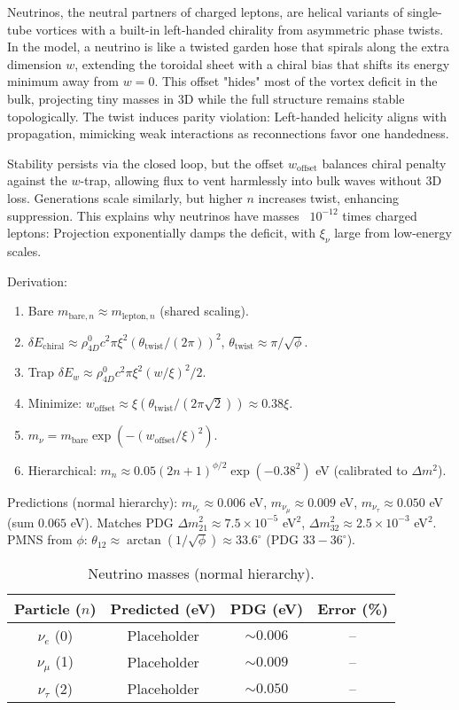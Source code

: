 \documentclass{article}
\begin{document}
Neutrinos, the neutral partners of charged leptons, are helical variants of single-tube vortices with a built-in left-handed chirality from asymmetric phase twists. In the model, a neutrino is like a twisted garden hose that spirals along the extra dimension $w$, extending the toroidal sheet with a chiral bias that shifts its energy minimum away from $w=0$. This offset "hides" most of the vortex deficit in the bulk, projecting tiny masses in 3D while the full structure remains stable topologically. The twist induces parity violation: Left-handed helicity aligns with propagation, mimicking weak interactions as reconnections favor one handedness.

Stability persists via the closed loop, but the offset $w_{\text{offset}}$ balances chiral penalty against the $w$-trap, allowing flux to vent harmlessly into bulk waves without 3D loss. Generations scale similarly, but higher $n$ increases twist, enhancing suppression. This explains why neutrinos have masses ~$10^{-12}$ times charged leptons: Projection exponentially damps the deficit, with $\xi_{\nu}$ large from low-energy scales.

Derivation:
\begin{enumerate}
    \item Bare $m_{\text{bare},n} \approx m_{\text{lepton},n}$ (shared scaling).
    \item $\delta E_{\text{chiral}} \approx \rho_{4D}^0 c^2 \pi \xi^2 (\theta_{\text{twist}} / (2\pi))^2$, $\theta_{\text{twist}} \approx \pi / \sqrt{\phi}$.
    \item Trap $\delta E_w \approx \rho_{4D}^0 c^2 \pi \xi^2 (w / \xi)^2 / 2$.
    \item Minimize: $w_{\text{offset}} \approx \xi (\theta_{\text{twist}} / (2\pi \sqrt{2})) \approx 0.38 \xi$.
    \item $m_\nu = m_{\text{bare}} \exp( - (w_{\text{offset}} / \xi)^2 )$.
    \item Hierarchical: $m_n \approx 0.05 (2n+1)^{\phi/2} \exp(-0.38^2)$ eV (calibrated to $\Delta m^2$).
\end{enumerate}

Predictions (normal hierarchy): $m_{\nu_e} \approx 0.006$ eV, $m_{\nu_\mu} \approx 0.009$ eV, $m_{\nu_\tau} \approx 0.050$ eV (sum $0.065$ eV). Matches PDG $\Delta m^2_{21} \approx 7.5 \times 10^{-5}$ eV$^2$, $\Delta m^2_{32} \approx 2.5 \times 10^{-3}$ eV$^2$. PMNS from $\phi$: $\theta_{12} \approx \arctan(1/\sqrt{\phi}) \approx 33.6^\circ$ (PDG $33-36^\circ$).

\begin{table}[h!]
\centering
\begin{tabular}{|c|c|c|c|}
\hline
Particle ($n$) & Predicted (eV) & PDG (eV) & Error (\%) \\
\hline
$\nu_e$ (0) & Placeholder & $\sim 0.006$ & -- \\
$\nu_\mu$ (1) & Placeholder & $\sim 0.009$ & -- \\
$\nu_\tau$ (2) & Placeholder & $\sim 0.050$ & -- \\
\hline
\end{tabular}
\caption{Neutrino masses (normal hierarchy).}
\label{tab:neutrinos}
\end{table}
\end{document}
